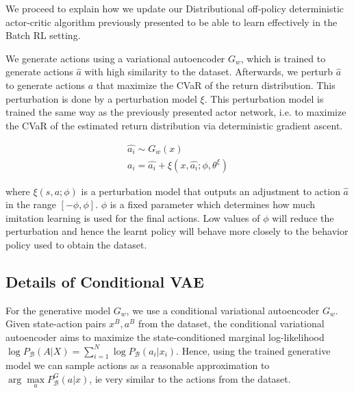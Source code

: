 We proceed to explain how we update our Distributional off-policy deterministic actor-critic algorithm previously
presented to be able to learn effectively in the Batch RL setting.

We generate actions using a  variational autoencoder $G_w$,
which is trained to generate actions $\hat{a}$ with high  similarity  to  the  dataset.  
Afterwards, we perturb $\hat{a}$  to generate actions $a$ that maximize the CVaR of the return
distribution. This perturbation is done by a perturbation model $\xi$.
This perturbation model is trained the same way as the previously presented actor network,
i.e. to maximize the CVaR of the estimated return distribution via deterministic gradient ascent.

\begin{align}
    \hat{a_i} \sim G_w(x)\\
    a_i =  \hat{a_i} + \xi(x,\hat{a_i};\phi,\theta^\xi)
\end{align}

where  $\xi(s,a;\phi)$ is a perturbation model that outputs an adjustment to action $\hat{a}$
in the range $[-\phi,\phi]$. $\phi$ is a fixed parameter which determines how much imitation learning
is used for the final actions. Low values of $\phi$ will reduce the perturbation and hence the 
learnt policy will behave more closely to the behavior policy used to obtain the dataset.



\subsection{Details of Conditional VAE}
For the generative model $G_w$, we use a conditional variational autoencoder $G_w$.
Given state-action pairs $x^B,a^B$ from the dataset, the conditional variational autoencoder
aims to maximize the state-conditioned marginal log-likelihood  
$\log P_\mathcal{B}(A|X) = \sum_{i=1}^{N}\log  P_\mathcal{B}(a_i|x_i)$.
Hence, using the trained generative model we can sample actions
as a reasonable approximation to $ \arg \underset{a}\max P_\mathcal{B}^G(a|x)$, ie very similar to 
the actions from the dataset.

